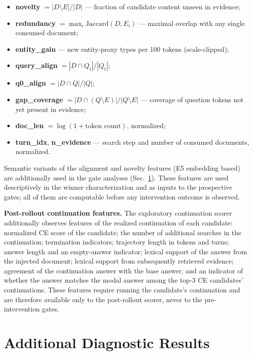 \documentclass[10pt]{article}
\newcommand{\stitle}[1]{\vspace{0.4em}\noindent\textbf{#1}\hspace{0.6em}}
\begin{document}
\begin{itemize}\itemsep0.15em
  \item \textbf{novelty} $=|D\setminus E|/|D|$ --- fraction of candidate
        content unseen in evidence;
  \item \textbf{redundancy} $=\max_i \mathrm{Jaccard}(D,E_i)$ --- maximal
        overlap with any single consumed document;
  \item \textbf{entity\_gain} --- new entity-proxy types per 100 tokens
        (scale-clipped);
  \item \textbf{query\_align} $=|D\cap Q_t|/|Q_t|$;
  \item \textbf{q0\_align} $=|D\cap Q|/|Q|$;
  \item \textbf{gap\_coverage} $=|D\cap(Q\setminus E)|/|Q\setminus E|$ ---
        coverage of question tokens not yet present in evidence;
  \item \textbf{doc\_len} $=\log(1+\text{token count})$, normalized;
  \item \textbf{turn\_idx}, \textbf{n\_evidence} --- search step and number of
        consumed documents, normalized.
\end{itemize}

\noindent
Semantic variants of the alignment and novelty features (E5 embedding based)
are additionally used in the gate analyses (Sec.~\ref{sec:diagnostic}).
These features are used descriptively in the winner characterization and as
inputs to the prospective gates; all of them are computable before any
intervention outcome is observed.

\stitle{Post-rollout continuation features.}
The exploratory continuation scorer additionally observes features of the
realized continuation of each candidate: normalized CE score of the
candidate; the number of additional searches in the continuation;
termination indicators; trajectory length in tokens and turns; answer length
and an empty-answer indicator; lexical support of the answer from the
injected document; lexical support from subsequently retrieved evidence;
agreement of the continuation answer with the base answer; and an indicator
of whether the answer matches the modal answer among the top-3 CE
candidates' continuations. These features require running the candidate's
continuation and are therefore available only to the post-rollout scorer,
never to the pre-intervention gates.

\section{Additional Diagnostic Results}
\label{sec:diagnostic}
\end{document}
